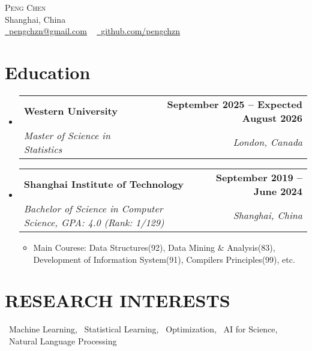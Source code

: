 \documentclass[letterpaper,11pt]{article}
\makeatletter
\newcommand{\resumeSubheading}[4]{
  \vspace{-2pt}\item
    \begin{tabular*}{1.0\textwidth}[t]{l@{\extracolsep{\fill}}r}
      \textbf{#1} & \textbf{\small #2} \\
      \textit{\small#3} & \textit{\small #4} \\
    \end{tabular*}\vspace{-7pt}
}
\newcommand{\resumeSubHeadingListStart}{\begin{itemize}[leftmargin=0.0in, label={}]}
\newcommand{\resumeSubHeadingListEnd}{\end{itemize}}
\makeatother
\begin{document}

\begin{center}
    {\Huge \scshape Peng Chen} \\ \vspace{1pt}
    Shanghai, China \\ \vspace{1pt}
    \small 
    \href{mailto:x@gmail.com}{\raisebox{-0.2\height}\faEnvelope\  \underline{pengchzn@gmail.com}} ~ 
    \href{https://github.com/}{\raisebox{-0.2\height}\faGithub\ \underline{github.com/pengchzn}}
    \vspace{-8pt}
\end{center}


\section{Education}
  \resumeSubHeadingListStart
    \resumeSubheading
      {Western University}{September 2025 -- Expected August 2026}
      {Master of Science in Statistics}{London, Canada}
    \resumeSubheading
      {Shanghai Institute of Technology}{September 2019 -- June 2024}
      {Bachelor of Science in Computer Science, GPA: 4.0 (Rank: 1/129)}{Shanghai, China}
        \begin{itemize}
                \item\small Main Courese: Data Structures(92), Data Mining $\&$ Analysis(83), Development of Information System(91), Compilers Principles(99), etc.
        \end{itemize}
  \resumeSubHeadingListEnd

\section{RESEARCH INTERESTS}
\ Machine Learning, \ Statistical Learning, \ Optimization, \ AI for Science, \ Natural Language Processing



\end{document}
